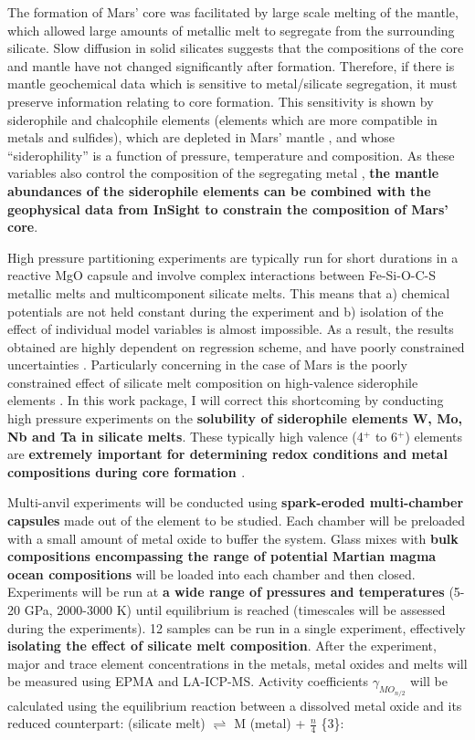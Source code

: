 \documentclass[11pt,twoside,a4paper]{article}
\begin{document}
The formation of Mars' core was facilitated by large scale melting of the mantle, which allowed large amounts of metallic melt to segregate from the surrounding silicate. Slow diffusion in solid silicates suggests that the compositions of the core and mantle have not changed significantly after formation. Therefore, if there is mantle geochemical data which is sensitive to metal/silicate segregation, it must preserve information relating to core formation. This sensitivity is shown by siderophile and chalcophile elements (elements which are more compatible in metals and sulfides), which are depleted in Mars' mantle \citep{HWBC2001}, and whose ``siderophility'' is a function of pressure, temperature and composition. As these variables also control the composition of the segregating metal \citep{Rubieetal2015}, \textbf{the mantle abundances of the siderophile elements can be combined with the geophysical data from InSight to constrain the composition of Mars' core}.


High pressure partitioning experiments are typically run for short durations in a reactive MgO capsule and involve complex interactions between Fe-Si-O-C-S metallic melts and multicomponent silicate melts. This means that a) chemical potentials are not held constant during the experiment and b) isolation of the effect of individual model variables is almost impossible. As a result, the results obtained are highly dependent on regression scheme, and have poorly constrained uncertainties \citep{WC2013}. Particularly concerning in the case of Mars is the poorly constrained effect of silicate melt composition on high-valence siderophile elements \citep{Righter2016}. In this work package, I will correct this shortcoming by conducting high pressure experiments on the \textbf{solubility of siderophile elements W, Mo, Nb and Ta in silicate melts}. These typically high valence (4$^+$ to 6$^+$) elements are \textbf{extremely important for determining redox conditions and metal compositions during core formation \citep{OBE2008,CHBBD2014}}.

Multi-anvil experiments will be conducted using \textbf{spark-eroded multi-chamber capsules} made out of the element to be studied. Each chamber will be preloaded with a small amount of metal oxide to buffer the system. Glass mixes with \textbf{bulk compositions encompassing the range of potential Martian magma ocean compositions} will be loaded into each chamber and then closed. Experiments will be run at \textbf{a wide range of pressures and temperatures} (5-20 GPa, 2000-3000 K) until equilibrium is reached (timescales will be assessed during the experiments). 12 samples can be run in a single experiment, effectively \textbf{isolating the effect of silicate melt composition}. After the experiment, major and trace element concentrations in the metals, metal oxides and melts will be measured using EPMA and LA-ICP-MS. Activity coefficients $\gamma_{MO_{n/2}}$ will be calculated using the equilibrium reaction between a dissolved metal oxide and its reduced counterpart:  (silicate melt) $\rightleftharpoons$ M (metal) + $\frac{n}{4}$ \{3\}:
\end{document}

